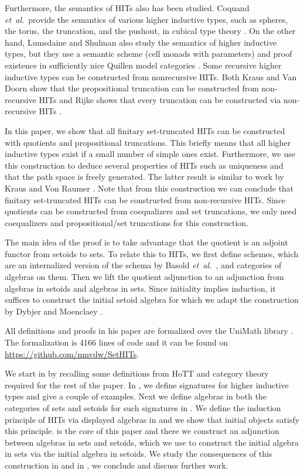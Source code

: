 \documentclass[9pt]{entcs}
\newcommand{\etal}{\emph{et~al.}}
\newcommand{\0}{\textbf{0}} %
\newcommand{\1}{\textbf{1}} %
\begin{document}
Furthermore, the semantics of HITs also has been studied.
Coquand \etal \ provide the semantics of various higher inductive types, such as spheres, the torus, the truncation, and the pushout, in cubical type theory \cite{BezemCH13,CohenCHM16,CoquandHM18}.
On the other hand, Lumsdaine and Shulman also study the semantics of higher inductive types, but they use a semantic scheme (cell monads with parameters) and proof existence in sufficiently nice Quillen model categories \cite{lumsdaine2017semantics}.
Some recursive higher inductive types can be constructed from nonrecursive HITs.
Both Kraus and Van Doorn show that the propositional truncation can be constructed from non-recursive HITs \cite{Kraus16,Doorn16} and Rijke shows that every truncation can be constructed via non-recursive HITs \cite{rijke2017join}.

In this paper, we show that all finitary set-truncated HITs can be constructed with quotients and propositional truncations. 
This briefly means that all higher inductive types exist if a small number of simple ones exist.
Furthermore, we use this construction to deduce several properties of HITs such as uniqueness and that the path space is freely generated.
The latter result is similar to work by Kraus and Von Raumer \cite{KrausRaumer}.
Note that from this construction we can conclude that finitary set-truncated HITs can be constructed from non-recursive HITs.
Since quotients can be constructed from coequalizers and set truncations, we only need coequalizers and propositional/set truncations for this construction.

The main idea of the proof is to take advantage that the quotient is an adjoint functor \cite{RijkeS15} from setoids to sets.
To relate this to HITs, we first define schemes, which are an internalized version of the schema by Basold \etal \ \cite{BasoldGW17}, and categories of algebras on them.
Then we lift the quotient adjunction to an adjunction from algebras in setoids and algebras in sets.
Since initiality implies induction, it suffices to construct the initial setoid algebra for which we adapt the construction by Dybjer and Moenclaey \cite{moeneclaey2016schema,DybjerM18}.

All definitions and proofs in his paper are formalized over the UniMath library \cite{UniMath}.
The formalization is 4166 lines of code and it can be found on \url{https://github.com/nmvdw/SetHITs}.

We start in  by recalling some definitions from HoTT and category theory required for the rest of the paper.
In , we define signatures for higher inductive types and give a couple of examples.
Next we define algebras in both the categories of sets and setoids for such signatures in .
We define the induction principle of HITs via displayed algebras in  and we show that initial objects satisfy this principle.
 is the core of this paper and there we construct an adjunction between algebras in sets and setoids, which we use to construct the initial algebra in sets via the initial algebra in setoids.
We study the consequences of this construction in  and in , we conclude and discuss further work.
\end{document}
